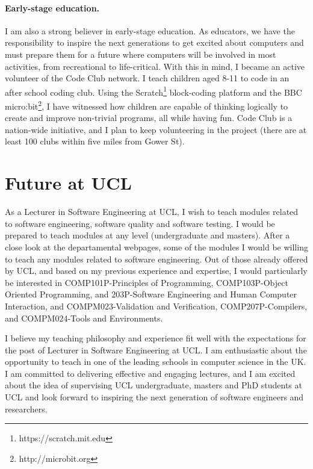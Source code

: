 \documentclass[a4paper]{article}
\begin{document}
\paragraph{Early-stage education.}  I am also a strong believer in
early-stage education. As educators, we have the responsibility to
inspire the next generations to get excited about computers and must
prepare them for a future where computers will be involved in most
activities, from recreational to life-critical. With this in mind, I
became an active volunteer of the Code Club network. I teach children
aged 8-11 to code in an after school coding club. Using the
Scratch\footnote{https://scratch.mit.edu} block-coding platform and
the BBC micro:bit\footnote{http://microbit.org}, I have witnessed how
children are capable of thinking logically to create and improve
non-trivial programs, all while having fun. Code Club is a nation-wide
initiative, and I plan to keep volunteering in the project (there are
at least 100 clubs within five miles from Gower St).

\section{Future at UCL}

As a Lecturer in Software Engineering at UCL, I wish to teach modules
related to software engineering, software quality and software
testing. I would be prepared to teach modules at any level
(undergraduate and masters). After a close look at the departamental
webpages, some of the modules I would be willing to teach any modules
related to software engineering. Out of those already offered by UCL,
and based on my previous experience and expertise, I would
particularly be interested in COMP101P-Principles of Programming,
COMP103P-Object Oriented Programming, and 203P-Software Engineering
and Human Computer Interaction, and COMPM023-Validation and
Verification, COMP207P-Compilers, and COMPM024-Tools and
Environments.

I believe my teaching philosophy and experience fit well with the
expectations for the post of Lecturer in Software Engineering at
UCL. I am enthusiastic about the opportunity to teach in one of the
leading schools in computer science in the UK. I am committed to
delivering effective and engaging lectures, and I am excited about the
idea of supervising UCL undergraduate, masters and PhD students at UCL and
look forward to inspiring the next generation of software engineers
and researchers.
\end{document}
